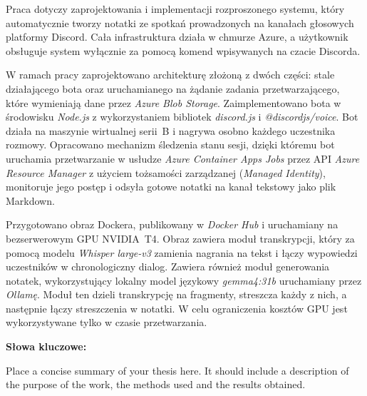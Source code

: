 
\begin{abstracts}
    \AbstractPL
	Praca dotyczy zaprojektowania i implementacji rozproszonego systemu, który automatycznie tworzy notatki 
	ze spotkań prowadzonych na kanałach głosowych platformy Discord. Cała infrastruktura działa w chmurze 
	Azure, a użytkownik obsługuje system wyłącznie za pomocą komend wpisywanych na czacie Discorda. \par

	W ramach pracy zaprojektowano architekturę złożoną z dwóch części: stale działającego bota oraz 
	uruchamianego na żądanie zadania przetwarzającego, które wymieniają dane przez \textit{Azure Blob Storage}. 
	Zaimplementowano bota w środowisku \textit{Node.js} z wykorzystaniem bibliotek \textit{discord.js} 
	i \textit{@discordjs/voice}. Bot działa na maszynie wirtualnej serii~B i nagrywa osobno każdego 
	uczestnika rozmowy. Opracowano mechanizm śledzenia stanu sesji, dzięki któremu bot uruchamia 
	przetwarzanie w usłudze \textit{Azure Container Apps Jobs} przez API \textit{Azure Resource Manager} 
	z użyciem tożsamości zarządzanej (\textit{Managed Identity}), monitoruje jego postęp i odsyła gotowe 
	notatki na kanał tekstowy jako plik Markdown. \par

	Przygotowano obraz Dockera, publikowany w \textit{Docker Hub} i uruchamiany na bezserwerowym GPU 
	NVIDIA~T4. Obraz zawiera moduł transkrypcji, który za pomocą modelu \textit{Whisper large-v3} zamienia 
	nagrania na tekst i łączy wypowiedzi uczestników w chronologiczny dialog. Zawiera również moduł 
	generowania notatek, wykorzystujący lokalny model językowy \textit{gemma4:31b} uruchamiany przez 
	\textit{Ollamę}. Moduł ten dzieli transkrypcję na fragmenty, streszcza każdy z nich, a następnie łączy 
	streszczenia w notatki. W celu ograniczenia kosztów GPU jest wykorzystywane tylko w czasie przetwarzania.

	\textbf{Słowa kluczowe:} \stSlowaKluczowe

	\AbstractENG
	Place a concise summary of your thesis here. 
	It should include a description of the purpose of the work, the methods used and the results obtained.
\end{abstracts}